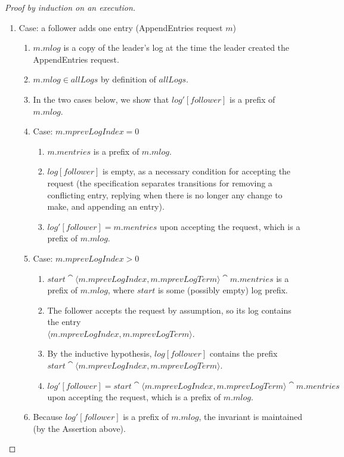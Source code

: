 \begin{proof}[Proof by induction on an execution]
\begin{enumerate}
\begin{enumerate}
\item Case: a follower adds one entry (AppendEntries request $m$)
\begin{enumerate}
\item $m.mlog$ is a copy of the leader's log at the time the
leader created the AppendEntries request. 
\item $m.mlog \in allLogs$ by definition of $allLogs$.
\item In the two cases below, we show that $log'[follower]$ is a prefix
of $m.mlog$.
\item Case: $m.mprevLogIndex = 0$
\begin{enumerate}
\item $m.mentries$ is a prefix of $m.mlog$.
\item $log[follower]$ is empty, as a necessary condition for accepting
the request (the specification separates transitions for removing
a conflicting entry, replying when there is no longer any change to
make, and appending an entry).
\item $log'[follower] = m.mentries$ upon accepting the request,
which is a prefix of $m.mlog$.
\end{enumerate}
\item Case: $m.mprevLogIndex > 0$
\begin{enumerate}
\item 
$start \cat \langle m.mprevLogIndex, m.mprevLogTerm \rangle
\cat m.mentries$
is a prefix of $m.mlog$,
where $start$ is some (possibly empty) log prefix.
\item The follower accepts the request by assumption, so its log
contains the entry \\$\langle m.mprevLogIndex, m.mprevLogTerm \rangle$.
\item By the inductive hypothesis, $log[follower]$
contains the prefix \\
$start \cat \langle m.mprevLogIndex, m.mprevLogTerm \rangle$.
\item $log'[follower] = start \cat \langle m.mprevLogIndex,
m.mprevLogTerm \rangle \cat m.mentries$ \\
upon accepting the request, which is a prefix of $m.mlog$.
\end{enumerate}
\item  Because $log'[follower]$ is a prefix of $m.mlog$, the invariant
is maintained (by the Assertion above).
\end{enumerate}
\end{enumerate}
\end{enumerate}
\end{proof}


